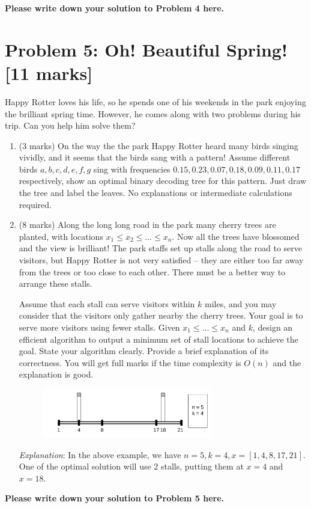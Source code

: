 \documentclass[11pt,twoside]{article}
\newcommand{\problem}[1]{\section*{Problem #1}}
\newenvironment{solution}{{\par\noindent\it Solution.}}{}
\begin{document}
\begin{solution}
\textbf{Please write down your solution to Problem 4 here.}
\end{solution}

\problem{5: Oh! Beautiful Spring! [11 marks]}

Happy Rotter loves his life, so he spends one of his weekends in the park enjoying the brilliant spring time. However, he comes along with two problems during his trip. Can you help him solve them?

\begin{enumerate}
	\item (3 marks) On the way the the park Happy Rotter heard many birds singing vividly, and it seems that the birds sang with a pattern!
    Assume different birds $a, b, c, d, e, f, g$ sing with frequencies $0.15, 0.23, 0.07, 0.18, 0.09, 0.11, 0.17$ respectively, show an optimal binary decoding tree for this pattern.
	Just draw the tree and label the leaves.
    No explanations or intermediate calculations required.

	\item (8 marks) Along the long long road in the park many cherry trees are planted, with locations $x_1 \leq x_2 \leq ... \leq x_n$.
	Now all the trees have blossomed and the view is brilliant!
	The park staffs set up stalls along the road to serve visitors, but Happy Rotter is not very satisfied -- they are either too far away from the trees or too close to each other.
	There must be a better way to arrange these stalls.

	Assume that each stall can serve visitors within $k$ miles, and you may consider that the visitors only gather nearby the cherry trees.
	Your goal is to serve more visitors using fewer stalls.
	Given $x_1 \leq ... \leq x_n$ and $k$, design an efficient algorithm to output a minimum set of stall locations to achieve the goal.
	State your algorithm clearly.
	Provide a brief explanation of its correctness.
	You will get full marks if the time complexity is $O(n)$ and the explanation is good.

	\begin{figure}[htbp]
		\centering
		\includegraphics[width=0.7\textwidth]{Q5_2.jpg}
		\label{fig:Q5.2}
	\end{figure}

	\textit{Explanation}: In the above example, we have $n = 5, k = 4, x = [1, 4, 8, 17, 21]$. One of the optimal solution will use $2$ stalls, putting them at $x = 4$ and $x = 18$.
\end{enumerate}

\begin{solution}
\textbf{Please write down your solution to Problem 5 here.}
\end{solution}
\end{document}
